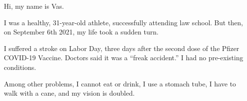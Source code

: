 Hi, my name is Vas.

I was a healthy, 31-year-old athlete, successfully attending law school. But
then, on September 6th 2021, my life took a sudden turn.

I suffered a stroke on Labor Day, three days after the second dose of the Pfizer
COVID-19 Vaccine. Doctors said it was a “freak accident.” I had no pre-existing
conditions.

Among other problems, I cannot eat or drink, I use a stomach tube, I have to
walk with a cane, and my vision is doubled.

